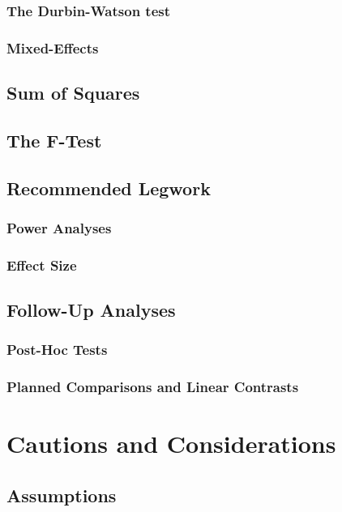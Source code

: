 \subsubsection{The Durbin-Watson test}

\subsubsection{Mixed-Effects}

\subsection{Sum of Squares}

\subsection{The F-Test}

\subsection{Recommended Legwork}

\subsubsection{Power Analyses}

\subsubsection{Effect Size}

\subsection{Follow-Up Analyses}

\subsubsection{Post-Hoc Tests}

\subsubsection{Planned Comparisons and Linear Contrasts}

\section{Cautions and Considerations}

\subsection{Assumptions}

